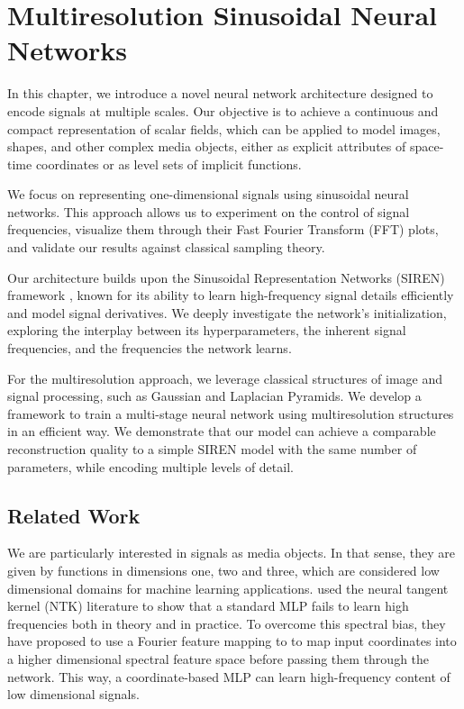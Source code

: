 \chapter{Multiresolution Sinusoidal Neural Networks}

In this chapter, we introduce a novel neural network architecture designed to encode signals at multiple scales. Our objective is to achieve a continuous and compact representation of scalar fields, which can be applied to model images, shapes, and other complex media objects, either as explicit attributes of space-time coordinates or as level sets of implicit functions.

We focus on representing one-dimensional signals using sinusoidal neural networks. This approach allows us to experiment on the control of signal frequencies, visualize them through their Fast Fourier Transform (FFT) plots, and validate our results against classical sampling theory.

Our architecture builds upon the Sinusoidal Representation Networks (SIREN) framework \cite{sitzmann2019siren}, known for its ability to learn high-frequency signal details efficiently and model signal derivatives. We deeply investigate the network's initialization, exploring the interplay between its hyperparameters, the inherent signal frequencies, and the frequencies the network learns.

For the multiresolution approach, we leverage classical structures of image and signal processing, such as Gaussian and Laplacian Pyramids. We develop a framework to train a multi-stage neural network using multiresolution structures in an efficient way. We demonstrate that our model can achieve a comparable reconstruction quality to a simple SIREN model with the same number of parameters, while encoding multiple levels of detail.


\section{Related Work}

We are particularly interested in signals as media objects. In that sense, they are given by functions in dimensions one, two and three, which are considered low dimensional domains for machine learning applications. \cite{tancik2020fourfeat} used the neural tangent kernel (NTK) literature to show that a standard MLP fails to learn high frequencies both in theory and in practice. To overcome this spectral bias, they have proposed to use a Fourier feature mapping to to map input coordinates into a higher dimensional spectral feature space before passing them through the network. This way, a coordinate-based MLP can learn high-frequency content of low dimensional signals.

